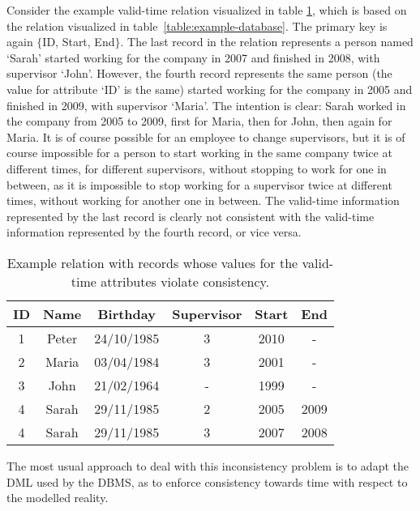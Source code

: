 \begin{example}
\label{ex:prob}
Consider the example valid-time relation visualized in table \ref{table:erconsistency}, which is based on the relation visualized in table~\ref{table:example-database}. The primary key is again $\{$ID, Start, End$\}$. The last record in the relation represents a person named `Sarah' started working for the company in 2007 and finished in 2008, with supervisor `John'. However, the fourth record represents the same person (the value for attribute `ID' is the same) started working for the company in 2005 and finished in 2009, with supervisor `Maria'. The intention is clear: Sarah worked in the company from 2005 to 2009, first for Maria, then for John, then again for Maria. It is of course possible for an employee to change supervisors, but it is of course impossible for a person to start working in the same company twice at different times, for different supervisors, without stopping to work for one in between, as it is impossible to stop working for a supervisor twice at different times, without working for another one in between. The valid-time information represented by the last record is clearly not consistent with the valid-time information represented by the fourth record, or vice versa.
\end{example}

\begin{table}
\centering
\caption{Example relation with records whose values for the valid-time attributes violate consistency.}
\begin{tabular}{c c c c c c }
\hline
\textbf{ID} & \textbf{Name} & \textbf{Birthday} & \textbf{Supervisor} & \textbf{Start} & \textbf{End} \\ \hline
1 & Peter & 24/10/1985 & 3 &  2010 & - \\
2 & Maria & 03/04/1984 & 3 & 2001 & - \\
3 & John & 21/02/1964 & - &  1999 & - \\
4 & Sarah & 29/11/1985 & 2 &  2005 & 2009 \\
4 & Sarah & 29/11/1985 & 3 &  2007 & 2008 \\
\hline 
\end{tabular}
\label{table:erconsistency}
\end{table}

The most usual approach to deal with this inconsistency problem is to adapt the DML used by the DBMS, as to enforce consistency towards time with respect to the modelled reality.

